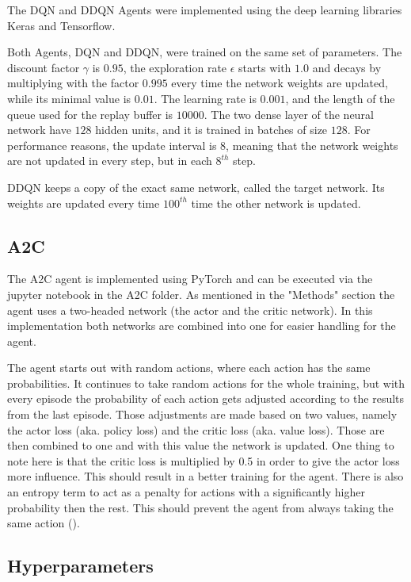 \documentclass[11pt,a4paper]{article}
\begin{document}
The DQN and DDQN Agents were implemented using the deep learning libraries Keras and Tensorflow.

Both Agents, DQN and DDQN, were trained on the same set of parameters. The discount factor $\gamma$ is $0.95$, the exploration rate $\epsilon$ starts with $1.0$ and decays by multiplying with the factor $0.995$ every time the network weights are updated, while its minimal value is $0.01$. The learning rate is $0.001$, and the length of the queue used for the replay buffer is $10000$. The two dense layer of the neural network have $128$ hidden units, and it is trained in batches of size $128$. For performance reasons, the update interval is $8$, meaning that the network weights are not updated in every step, but in each $8^{th}$ step.

DDQN keeps a copy of the exact same network, called the target network. Its weights are updated every time $100^{th}$ time the other network is updated.

\subsection{A2C}
The A2C agent is implemented using PyTorch and can be executed via the jupyter notebook in the A2C folder. As mentioned in the "Methods" section the agent uses a two-headed network (the actor and the critic network). In this implementation both networks are combined into one for easier handling for the agent.

The agent starts out with random actions, where each action has the same probabilities. It continues to take random actions for the whole training, but with every episode the probability of each action gets adjusted according to the results from the last episode. Those adjustments are made based on two values, namely the actor loss (aka. policy loss) and the critic loss (aka. value loss). Those are then combined to one and with this value the network is updated. One thing to note here is that the critic loss is multiplied by 0.5 in order to give the actor loss more influence. This should result in a better training for the agent. There is also an entropy term to act as a penalty for actions with a significantly higher probability then the rest. This should prevent the agent from always taking the same action (\cite{actorCritics2}).


\subsection{Hyperparameters}
\end{document}
